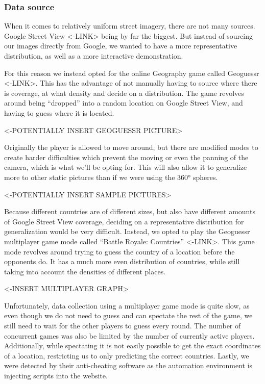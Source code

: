 \documentclass{article}
\begin{document}
\subsubsection{Data source}\label{data-source}

When it comes to relatively uniform street imagery, there are not many
sources. Google Street View \textless-LINK\textgreater{} being by far
the biggest. But instead of sourcing our images directly from Google, we
wanted to have a more representative distribution, as well as a more
interactive demonstration.

For this reason we instead opted for the online Geography game called
Geoguessr \textless-LINK\textgreater. This has the advantage of not
manually having to source where there is coverage, at what density and
decide on a distribution. The game revolves around being ``dropped''
into a random location on Google Street View, and having to guess where
it is located.

\textless-POTENTIALLY INSERT GEOGUESSR PICTURE\textgreater{}

Originally the player is allowed to move around, but there are modified
modes to create harder difficulties which prevent the moving or even the
panning of the camera, which is what we'll be opting for. This will also
allow it to generalize more to other static pictures than if we were
using the 360° spheres.

\textless-POTENTIALLY INSERT SAMPLE PICTURES\textgreater{}

Because different countries are of different sizes, but also have
different amounts of Google Street View coverage, deciding on a
representative distribution for generalization would be very difficult.
Instead, we opted to play the Geoguessr multiplayer game mode called
``Battle Royale: Countries'' \textless-LINK\textgreater. This game mode
revolves around trying to guess the country of a location before the
opponents do. It has a much more even distribution of countries, while
still taking into account the densities of different places.

\textless-INSERT MULTIPLAYER GRAPH\textgreater{}

Unfortunately, data collection using a multiplayer game mode is quite
slow, as even though we do not need to guess and can spectate the rest
of the game, we still need to wait for the other players to guess every
round. The number of concurrent games was also be limited by the number
of currently active players. Additionally, while spectating it is not
easily possible to get the exact coordinates of a location, restricting
us to only predicting the correct countries. Lastly, we were detected by
their anti-cheating software as the automation environment is injecting
scripts into the website.
\end{document}
